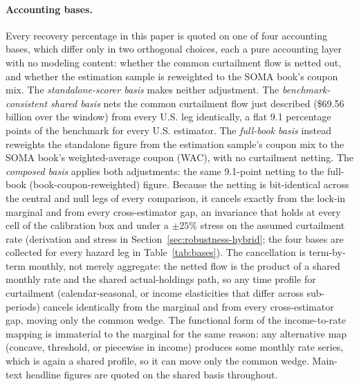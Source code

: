\documentclass[12pt]{article}
\begin{document}
\paragraph{Accounting bases.} Every recovery percentage in this paper is quoted on one of four accounting bases, which differ only in two orthogonal choices, each a pure accounting layer with no modeling content: whether the common curtailment flow is netted out, and whether the estimation sample is reweighted to the SOMA book's coupon mix. The \emph{standalone-scorer basis} makes neither adjustment. The \emph{benchmark-consistent shared basis} nets the common curtailment flow just described (\$69.56 billion over the window) from every U.S. leg identically, a flat 9.1 percentage points of the benchmark for every U.S. estimator. The \emph{full-book basis} instead reweights the standalone figure from the estimation sample's coupon mix to the SOMA book's weighted-average coupon (WAC), with no curtailment netting. The \emph{composed basis} applies both adjustments: the same 9.1-point netting to the full-book (book-coupon-reweighted) figure. Because the netting is bit-identical across the central and null legs of every comparison, it cancels exactly from the lock-in marginal and from every cross-estimator gap, an invariance that holds at every cell of the calibration box and under a $\pm 25\%$ stress on the assumed curtailment rate (derivation and stress in Section~\ref{sec:robustness-hybrid}; the four bases are collected for every hazard leg in Table~\ref{tab:bases}). The cancellation is term-by-term monthly, not merely aggregate: the netted flow is the product of a shared monthly rate and the shared actual-holdings path, so any time profile for curtailment (calendar-seasonal, or income elasticities that differ across sub-periods) cancels identically from the marginal and from every cross-estimator gap, moving only the common wedge. The functional form of the income-to-rate mapping is immaterial to the marginal for the same reason: any alternative map (concave, threshold, or piecewise in income) produces some monthly rate series, which is again a shared profile, so it can move only the common wedge. Main-text headline figures are quoted on the shared basis throughout.
\end{document}
